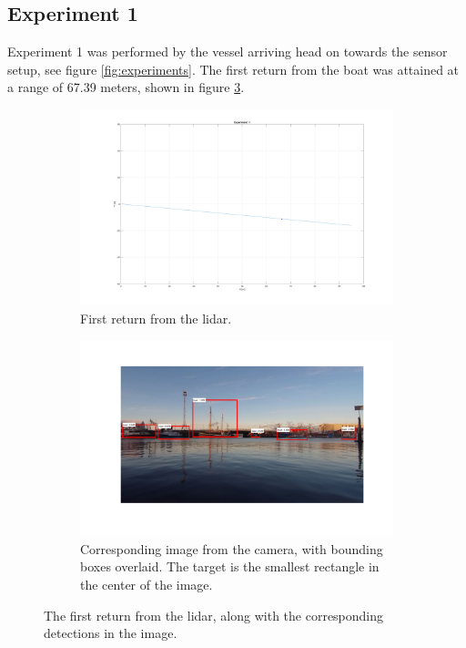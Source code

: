 \subsection{Experiment 1}
Experiment 1 was performed by the vessel arriving head on towards the sensor setup, see figure \ref{fig:experiments}.
The first return from the boat was attained at a range of 67.39 meters, shown in figure \ref{fig:ex1_1}.
\begin{figure}[htbp]
	\centering
	\begin{subfigure}[t]{.5\textwidth}
		\centering
		\includegraphics[width=\linewidth]{fig/detection_1_exp_1.png}
		\caption{First return from the lidar.}
		\label{fig:sub_e1l1}
	\end{subfigure}%
	\begin{subfigure}[t]{.5\textwidth}
		\centering
		\includegraphics[width=\linewidth]{fig/detection_1_exp_1_img.png}
		\caption{Corresponding image from the camera, with bounding boxes overlaid. The target is the smallest rectangle in the center of the image.}
		\label{fig:sub_e1i1}
	\end{subfigure}
	\caption{The first return from the lidar, along with the corresponding detections in the image.}
	\label{fig:ex1_1}
\end{figure}
